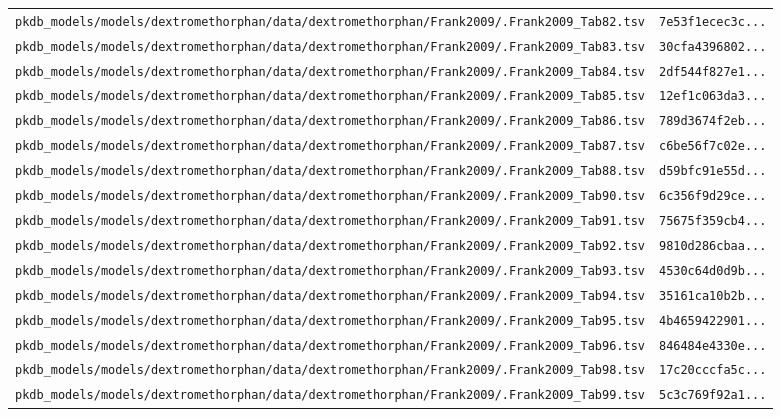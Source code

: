 \documentclass{article}
\begin{document}
\begin{longtable}{ll}
\texttt{pkdb\_models/models/dextromethorphan/data/dextromethorphan/Frank2009/.Frank2009\_Tab82.tsv} & \texttt{7e53f1ecec3c...} \\
\texttt{pkdb\_models/models/dextromethorphan/data/dextromethorphan/Frank2009/.Frank2009\_Tab83.tsv} & \texttt{30cfa4396802...} \\
\texttt{pkdb\_models/models/dextromethorphan/data/dextromethorphan/Frank2009/.Frank2009\_Tab84.tsv} & \texttt{2df544f827e1...} \\
\texttt{pkdb\_models/models/dextromethorphan/data/dextromethorphan/Frank2009/.Frank2009\_Tab85.tsv} & \texttt{12ef1c063da3...} \\
\texttt{pkdb\_models/models/dextromethorphan/data/dextromethorphan/Frank2009/.Frank2009\_Tab86.tsv} & \texttt{789d3674f2eb...} \\
\texttt{pkdb\_models/models/dextromethorphan/data/dextromethorphan/Frank2009/.Frank2009\_Tab87.tsv} & \texttt{c6be56f7c02e...} \\
\texttt{pkdb\_models/models/dextromethorphan/data/dextromethorphan/Frank2009/.Frank2009\_Tab88.tsv} & \texttt{d59bfc91e55d...} \\
\texttt{pkdb\_models/models/dextromethorphan/data/dextromethorphan/Frank2009/.Frank2009\_Tab90.tsv} & \texttt{6c356f9d29ce...} \\
\texttt{pkdb\_models/models/dextromethorphan/data/dextromethorphan/Frank2009/.Frank2009\_Tab91.tsv} & \texttt{75675f359cb4...} \\
\texttt{pkdb\_models/models/dextromethorphan/data/dextromethorphan/Frank2009/.Frank2009\_Tab92.tsv} & \texttt{9810d286cbaa...} \\
\texttt{pkdb\_models/models/dextromethorphan/data/dextromethorphan/Frank2009/.Frank2009\_Tab93.tsv} & \texttt{4530c64d0d9b...} \\
\texttt{pkdb\_models/models/dextromethorphan/data/dextromethorphan/Frank2009/.Frank2009\_Tab94.tsv} & \texttt{35161ca10b2b...} \\
\texttt{pkdb\_models/models/dextromethorphan/data/dextromethorphan/Frank2009/.Frank2009\_Tab95.tsv} & \texttt{4b4659422901...} \\
\texttt{pkdb\_models/models/dextromethorphan/data/dextromethorphan/Frank2009/.Frank2009\_Tab96.tsv} & \texttt{846484e4330e...} \\
\texttt{pkdb\_models/models/dextromethorphan/data/dextromethorphan/Frank2009/.Frank2009\_Tab98.tsv} & \texttt{17c20cccfa5c...} \\
\texttt{pkdb\_models/models/dextromethorphan/data/dextromethorphan/Frank2009/.Frank2009\_Tab99.tsv} & \texttt{5c3c769f92a1...} \\

\end{longtable}
\end{document}
